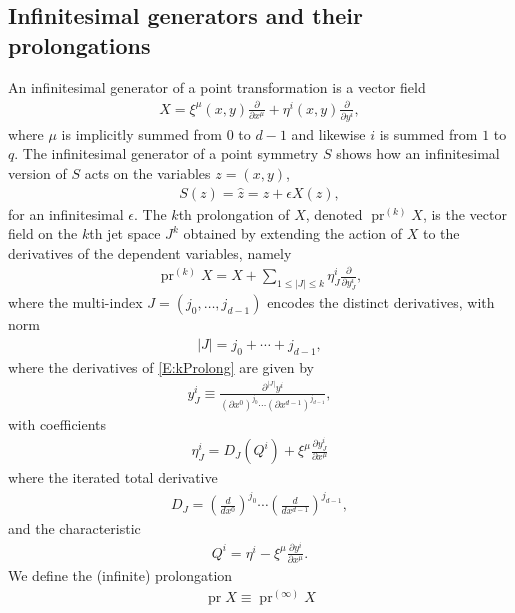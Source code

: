 \documentclass[a4paper,hidelinks, 12pt]{article}
\numberwithin{equation}{section}
\theoremstyle{plain}
\newcommand{\on}{\operatorname}
\begin{document}
\subsection{Infinitesimal generators and their prolongations}
\label{sec:InfinitesimalGenerators}
An infinitesimal generator of a point transformation 
is a vector field
\begin{align}\label{E:infGenPoint}
	X= \xi^\mu(x,y)\frac{\partial}{\partial x^\mu} + \eta^i(x,y)\frac{\partial}{\partial y^i}, 
\end{align}
where $\mu$ is implicitly summed from $0$ to $d-1$ and likewise $i$ is summed from $1$ to $q$. The infinitesimal generator of a point symmetry $S$ shows
how an infinitesimal version of $S$ acts on the variables $z=(x,y)$,
\begin{align}
	S(z)=\hat{z}=z+\epsilon X(z),
\end{align}
  for an infinitesimal $\epsilon$. 
	The $k$th prolongation of $X$, denoted $\operatorname{pr}^{(k)}X$, is the
vector field on the $k$th jet space $J^k$ obtained by extending the action of 
$X$ to the derivatives of the
dependent variables, namely
\begin{align}\label{E:kProlong}
	\on{pr}^{(k)}X= X+ \sum_{1\leq|J|\leq k} \eta_J^i\frac{\partial}{\partial y^i_J},   
\end{align}
 where the multi-index $J=(j_0,\ldots,j_{d-1})$ encodes the distinct derivatives,
with norm
\begin{align}\label{E:|J|}
|J|=j_0+\cdots+j_{d-1},
\end{align}
where the derivatives of \eqref{E:kProlong} are given by
\begin{align}\label{E:y^i_J}
	y^i_J\equiv \frac{\partial^{|J|} y^i}{(\partial x^0)^{j_0}\cdots(\partial x^{d-1})^{j_{d-1}}},
\end{align}
with coefficients
\begin{align}
	\eta_J^i=D_J(Q^i)+\xi^\mu \frac{\partial y^i_J}{\partial x^\mu}
\end{align}
where the iterated total derivative 
\begin{align}\label{E:itTotder}
	D_J= (\frac{d}{dx^0})^{j_0}\cdots  (\frac{d}{dx^{d-1}})^{j_{d-1}},
\end{align}
and the characteristic
\begin{align}\label{E:characteristicDef}
	Q^i=\eta^i -\xi^\mu \frac{\partial y^i}{\partial x^\mu}.
\end{align}
We define the (infinite) prolongation
\begin{align}
  \operatorname{pr} X \equiv \operatorname{pr}^{(\infty)} X
\end{align}
\end{document}
